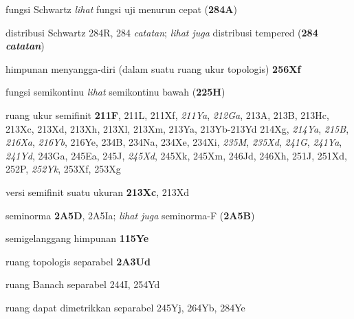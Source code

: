 fungsi Schwartz {\it lihat} fungsi uji menurun cepat
({\bf 284A})


distribusi Schwartz 284R, 284 {\it catatan};
  {\it lihat juga} distribusi tempered ({\bf 284 {\it catatan}})




















himpunan menyangga-diri (dalam suatu ruang ukur topologis)
{\bf 256Xf}









fungsi semikontinu
  {\it lihat} semikontinu bawah ({\bf 225H})






ruang ukur semifinit {\bf 211F}, 211L, 211Xf, {\it 211Ya},
{\it 212Ga}, 213A, 213B, 213Hc, 213Xc, 213Xd, 213Xh, 213Xl, 213Xm,
213Ya, 213Yb-213Yd 
214Xg, {\it 214Ya}, {\it 215B},
{\it 216Xa}, {\it 216Yb}, 216Ye, 234B, 234Na, 234Xe, 234Xi,
{\it 235M}, {\it 235Xd}, {\it 241G}, {\it 241Ya}, {\it 241Yd},
243Ga, 245Ea, 245J, {\it 245Xd}, 245Xk, 245Xm, 246Jd,
246Xh, 251J, 251Xd, 252P, {\it 252Yk}, 253Xf, 253Xg


versi semifinit suatu ukuran {\bf 213Xc}, 213Xd





seminorma {\bf 2A5D}, 2A5Ia;  
{\it lihat juga} seminorma-F ({\bf 2A5B})





semigelanggang himpunan {\bf 115Ye}



ruang topologis separabel {\bf 2A3Ud}


ruang Banach separabel 244I, 254Yd




ruang dapat dimetrikkan separabel 245Yj, 264Yb, 284Ye






